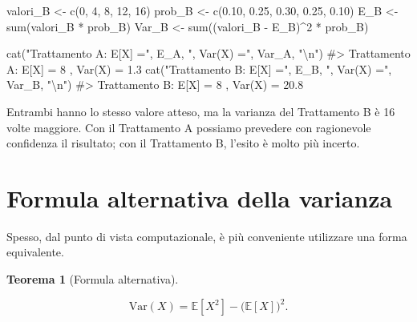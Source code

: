 \documentclass[
  italian,
  letterpaper,
  a4paper,
  11pt,
  open=any]{scrbook}
\newenvironment{Shaded}{\begin{snugshade}}{\end{snugshade}}
\newcommand{\CommentTok}[1]{\textcolor[rgb]{0.37,0.37,0.37}{#1}}
\newcommand{\DecValTok}[1]{\textcolor[rgb]{0.68,0.00,0.00}{#1}}
\newcommand{\FloatTok}[1]{\textcolor[rgb]{0.68,0.00,0.00}{#1}}
\newcommand{\FunctionTok}[1]{\textcolor[rgb]{0.28,0.35,0.67}{#1}}
\newcommand{\NormalTok}[1]{\textcolor[rgb]{0.00,0.23,0.31}{#1}}
\newcommand{\OtherTok}[1]{\textcolor[rgb]{0.00,0.23,0.31}{#1}}
\newcommand{\SpecialCharTok}[1]{\textcolor[rgb]{0.37,0.37,0.37}{#1}}
\newcommand{\StringTok}[1]{\textcolor[rgb]{0.13,0.47,0.30}{#1}}
\theoremstyle{plain}
\newtheorem{theorem}{Teorema}[chapter]
\theoremstyle{definition}
\theoremstyle{definition}
\theoremstyle{remark}
\begin{document}
\begin{tcolorbox}
\begin{Shaded}
\begin{Highlighting}[]
\NormalTok{valori\_B }\OtherTok{\textless{}{-}} \FunctionTok{c}\NormalTok{(}\DecValTok{0}\NormalTok{, }\DecValTok{4}\NormalTok{, }\DecValTok{8}\NormalTok{, }\DecValTok{12}\NormalTok{, }\DecValTok{16}\NormalTok{)}
\NormalTok{prob\_B }\OtherTok{\textless{}{-}} \FunctionTok{c}\NormalTok{(}\FloatTok{0.10}\NormalTok{, }\FloatTok{0.25}\NormalTok{, }\FloatTok{0.30}\NormalTok{, }\FloatTok{0.25}\NormalTok{, }\FloatTok{0.10}\NormalTok{)}
\NormalTok{E\_B }\OtherTok{\textless{}{-}} \FunctionTok{sum}\NormalTok{(valori\_B }\SpecialCharTok{*}\NormalTok{ prob\_B)}
\NormalTok{Var\_B }\OtherTok{\textless{}{-}} \FunctionTok{sum}\NormalTok{((valori\_B }\SpecialCharTok{{-}}\NormalTok{ E\_B)}\SpecialCharTok{\^{}}\DecValTok{2} \SpecialCharTok{*}\NormalTok{ prob\_B)}

\FunctionTok{cat}\NormalTok{(}\StringTok{"Trattamento A: E[X] ="}\NormalTok{, E\_A, }\StringTok{", Var(X) ="}\NormalTok{, Var\_A, }\StringTok{"}\SpecialCharTok{\textbackslash{}n}\StringTok{"}\NormalTok{)}
\CommentTok{\#\textgreater{} Trattamento A: E[X] = 8 , Var(X) = 1.3}
\FunctionTok{cat}\NormalTok{(}\StringTok{"Trattamento B: E[X] ="}\NormalTok{, E\_B, }\StringTok{", Var(X) ="}\NormalTok{, Var\_B, }\StringTok{"}\SpecialCharTok{\textbackslash{}n}\StringTok{"}\NormalTok{)}
\CommentTok{\#\textgreater{} Trattamento B: E[X] = 8 , Var(X) = 20.8}
\end{Highlighting}
\end{Shaded}

Entrambi hanno lo stesso valore atteso, ma la varianza del Trattamento B
è 16 volte maggiore. Con il Trattamento A possiamo prevedere con
ragionevole confidenza il risultato; con il Trattamento B, l'esito è
molto più incerto.

\end{tcolorbox}

\section{Formula alternativa della
varianza}\label{sec-variance-alternative}

Spesso, dal punto di vista computazionale, è più conveniente utilizzare
una forma equivalente.

\begin{theorem}[Formula
alternativa]\protect\hypertarget{thm-variance-formula}{}\label{thm-variance-formula}

\[
\text{Var}(X) = \mathbb{E}[X^2] - \bigl(\mathbb{E}[X]\bigr)^2.
\]

\end{theorem}
\end{document}
